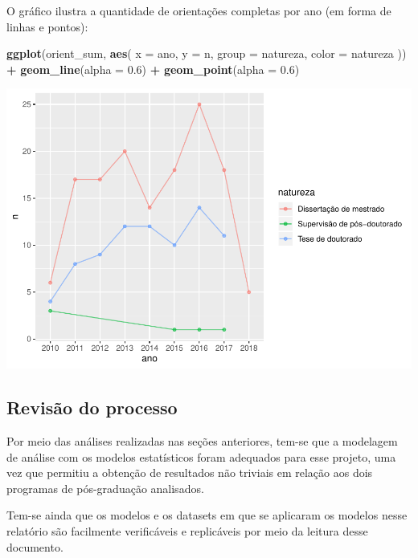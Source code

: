 \documentclass[]{article}
\newenvironment{Shaded}{\begin{snugshade}}{\end{snugshade}}
\newcommand{\DataTypeTok}[1]{\textcolor[rgb]{0.13,0.29,0.53}{#1}}
\newcommand{\FloatTok}[1]{\textcolor[rgb]{0.00,0.00,0.81}{#1}}
\newcommand{\KeywordTok}[1]{\textcolor[rgb]{0.13,0.29,0.53}{\textbf{#1}}}
\newcommand{\NormalTok}[1]{#1}
\newcommand{\OperatorTok}[1]{\textcolor[rgb]{0.81,0.36,0.00}{\textbf{#1}}}
\newcommand{\StringTok}[1]{\textcolor[rgb]{0.31,0.60,0.02}{#1}}
\begin{document}
O gráfico ilustra a quantidade de orientações completas por ano (em
forma de linhas e pontos):

\begin{Shaded}
\begin{Highlighting}[]
\KeywordTok{ggplot}\NormalTok{(orient_sum, }\KeywordTok{aes}\NormalTok{(}
  \DataTypeTok{x =}\NormalTok{ ano,}
  \DataTypeTok{y =}\NormalTok{ n,}
  \DataTypeTok{group =}\NormalTok{ natureza,}
  \DataTypeTok{color =}\NormalTok{ natureza}
\NormalTok{)) }\OperatorTok{+}
\StringTok{  }\KeywordTok{geom_line}\NormalTok{(}\DataTypeTok{alpha =} \FloatTok{0.6}\NormalTok{) }\OperatorTok{+}
\StringTok{  }\KeywordTok{geom_point}\NormalTok{(}\DataTypeTok{alpha =} \FloatTok{0.6}\NormalTok{)}
\end{Highlighting}
\end{Shaded}

\includegraphics{LuanFreitas.relatorio2_files/figure-latex/unnamed-chunk-93-1.pdf}

\hypertarget{revisuxe3o-do-processo}{%
\subsection{Revisão do processo}\label{revisuxe3o-do-processo}}

Por meio das análises realizadas nas seções anteriores, tem-se que a
modelagem de análise com os modelos estatísticos foram adequados para
esse projeto, uma vez que permitiu a obtenção de resultados não triviais
em relação aos dois programas de pós-graduação analisados.

Tem-se ainda que os modelos e os datasets em que se aplicaram os modelos
nesse relatório são facilmente verificáveis e replicáveis por meio da
leitura desse documento.
\end{document}
